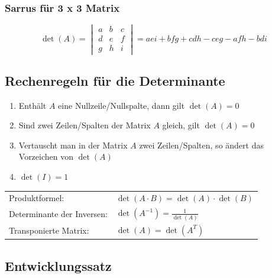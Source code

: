 \subsubsection{Sarrus für 3 x 3 Matrix}

\vspace{-0.2cm}
$$\det(A) = 
	\begin{vmatrix}
		a & b &c \\
		d & e & f\\
		g & h & i
	\end{vmatrix} 
= aei + bfg + cdh - ceg - afh - bdi$$


\subsection{Rechenregeln für die Determinante}

\begin{enumerate}
	\item Enthält $A$ eine Nullzeile/Nullspalte, dann gilt $\det(A) = 0$
	\item Sind zwei Zeilen/Spalten der Matrix $A$ gleich, gilt $\det(A) = 0$
	\item Vertauscht man in der Matrix $A$ zwei Zeilen/Spalten, so ändert das Vorzeichen von $\det(A)$
	\item $\det(I) = 1$
\end{enumerate}

\vspace{0.2cm}
\renewcommand{\arraystretch}{1.4}
\begin{tabular}{ll}
	Produktformel: 				& $\det(A \cdot B) = \det(A) \cdot \det(B)$ \\
	Determinante der Inversen: 	& $\det(A^{-1}) = \frac{1}{\det(A)}$ \\
	Transponierte Matrix: 		& $\det(A) = \det(A^T)$ \\
\end{tabular}
\renewcommand{\arraystretch}{1}


\subsection{Entwicklungssatz}
		
